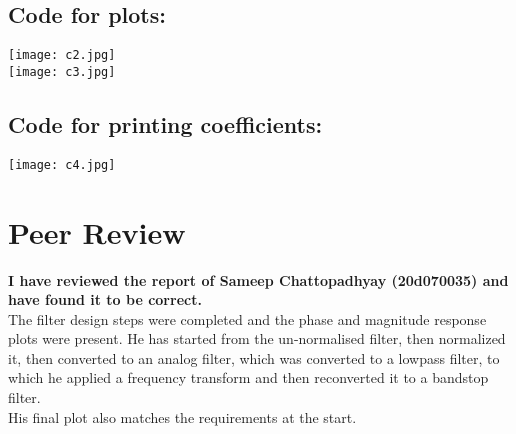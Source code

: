 \documentclass[12pt]{article}
\begin{document}
\subsection{Code for plots:}
\begin{center}
\texttt{[image: c2.jpg]}
\\\texttt{[image: c3.jpg]}
\end{center}
\subsection{Code for printing coefficients:}
\begin{center}
\texttt{[image: c4.jpg]}
\end{center}
\section{Peer Review}
\textbf{I have reviewed the report of Sameep Chattopadhyay (20d070035) and have found it to be correct.} 
\\The filter design steps were completed and the phase and magnitude response plots were present. He has started from the un-normalised filter, then normalized it, then converted to an analog filter, which was converted to a lowpass filter, to which he applied a frequency transform and then reconverted it to a bandstop filter.
\\His final plot also matches the requirements at the start.
\end{document}
